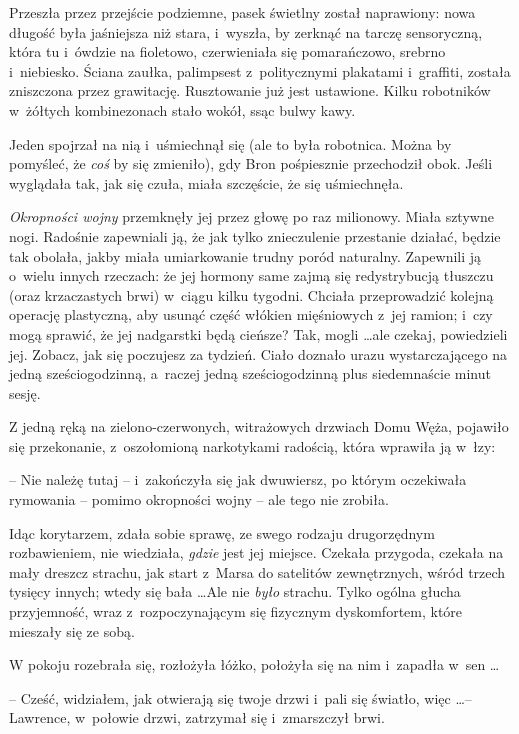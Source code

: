 \documentclass[oneside,polish,11pt,rmheadings]{mwbk}
\begin{document}
Przeszła przez przejście podziemne, pasek świetlny został naprawiony: nowa długość była jaśniejsza niż stara, i~wyszła, by zerknąć na tarczę sensoryczną, która tu i~ówdzie na fioletowo, czerwieniała się pomarańczowo, srebrno i~niebiesko. Ściana zaułka, palimpsest z~politycznymi plakatami i~graffiti, została zniszczona przez grawitację. Rusztowanie już jest ustawione. Kilku robotników w~żółtych kombinezonach stało wokół, ssąc bulwy kawy. 

Jeden spojrzał na nią i~uśmiechnął się (ale to była robotnica. Można by pomyśleć, że \textit{coś } by się zmieniło), gdy Bron pośpiesznie przechodził obok. Jeśli wyglądała tak, jak się czuła, miała szczęście, że się uśmiechnęła. 

\textit{Okropności wojny} przemknęły jej przez głowę po raz milionowy. Miała sztywne nogi. Radośnie zapewniali ją, że jak tylko znieczulenie przestanie działać, będzie tak obolała, jakby miała umiarkowanie trudny poród naturalny. Zapewnili ją o~wielu innych rzeczach: że jej hormony same zajmą się redystrybucją tłuszczu (oraz krzaczastych brwi) w~ciągu kilku tygodni. Chciała przeprowadzić kolejną operację plastyczną, aby usunąć część włókien mięśniowych z~jej ramion; i~czy mogą sprawić, że jej nadgarstki będą cieńsze? Tak, mogli \ldots  ale czekaj, powiedzieli jej. Zobacz, jak się poczujesz za tydzień. Ciało doznało urazu wystarczającego na jedną sześciogodzinną, a~raczej jedną sześciogodzinną plus siedemnaście minut sesję. 

Z jedną ręką na zielono-czerwonych, witrażowych drzwiach Domu Węża, pojawiło się przekonanie, z~oszołomioną narkotykami radością, która wprawiła ją w~łzy: 

-- Nie należę tutaj -- i~zakończyła się jak dwuwiersz, po którym oczekiwała rymowania -- pomimo okropności wojny -- ale tego nie zrobiła. 

Idąc korytarzem, zdała sobie sprawę, ze swego rodzaju drugorzędnym rozbawieniem, nie wiedziała, \textit{gdzie }jest jej miejsce. Czekała przygoda, czekała na mały dreszcz strachu, jak start z~Marsa do satelitów zewnętrznych, wśród trzech tysięcy innych; wtedy się bała \ldots  Ale nie \textit{było }strachu. Tylko ogólna głucha przyjemność, wraz z~rozpoczynającym się fizycznym dyskomfortem, które mieszały się ze sobą. 

W pokoju rozebrała się, rozłożyła łóżko, położyła się na nim i~zapadła w~sen \ldots  

-- Cześć, widziałem, jak otwierają się twoje drzwi i~pali się światło, więc \ldots  -- Lawrence, w~połowie drzwi, zatrzymał się i~zmarszczył brwi. 
\end{document}
